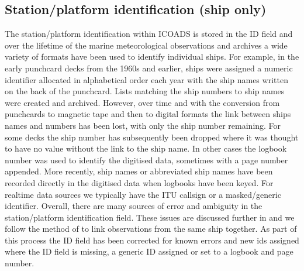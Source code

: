\FloatBarrier
\subsection{Station/platform identification (ship only)}
The station/platform identification within ICOADS is stored in the ID field and over the lifetime of the marine meteorological observations and archives a wide variety of formats have been used to identify individual ships. 
For example, in the early punchcard decks from the 1960s and earlier, ships were assigned a numeric identifier allocated in alphabetical order each year with the ship names written on the back of the punchcard. Lists matching the ship numbers to ship names were created and archived. 
However, over time and with the conversion from punchcards to magnetic tape and then to digital formats the link between ships names and numbers has been lost, with only the ship number remaining.
For some decks the ship number has subsequently been dropped where it was thought to have no value without the link to the ship name.
In other cases the logbook number was used to identify the digitised data, sometimes with a page number appended.
More recently, ship names or abbreviated ship names have been recorded directly in the digitised data when logbooks have been keyed.
For realtime data sources we typically have the ITU callsign or a masked/generic identifier.
Overall, there are many sources of error and ambiguity in the station/platform identification field.
These issues are discussed further in \cite{Carella2017_tracking} and we follow the method of \cite{Carella2017_tracking} to link observations from the same ship together.
As part of this process the ID field has been corrected for known errors and new ids assigned where the ID field is missing, a generic ID assigned or set to a logbook and page number.
\FloatBarrier

